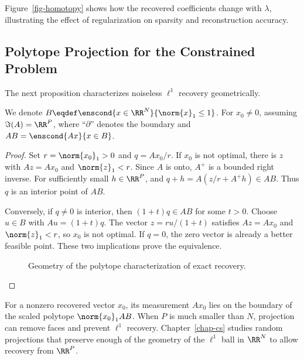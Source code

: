 Figure~\ref{fig-homotopy} shows how the recovered coefficients change with $\lambda$, illustrating the effect of regularization on sparsity and reconstruction accuracy.





                                                                                  
\subsection{Polytope Projection for the Constrained Problem}
\label{sec-polytope-proj}

The next proposition characterizes noiseless $\ell^1$ recovery geometrically.

\begin{prop}\label{prop-polytope-proj}
	We denote $B \eqdef \enscond{x \in \RR^N}{\norm{x}_1 \leq 1}$. For $x_0\neq0$, assuming $\Im(A)=\RR^P$,
	where ``$\partial$'' denotes the boundary and $AB=\enscond{Ax}{x\in B}$.
\end{prop}

\begin{proof}
Set $r=\norm{x_0}_1>0$ and $q=Ax_0/r$. If $x_0$ is not optimal, there is $z$ with $Az=Ax_0$ and $\norm{z}_1<r$. Since $A$ is onto, $A^+$ is a bounded right inverse. For sufficiently small $h\in\RR^P$,
and $q+h=A(z/r+A^+h)\in AB$. Thus $q$ is an interior point of $AB$.

Conversely, if $q\neq0$ is interior, then $(1+t)q\in AB$ for some $t>0$. Choose $u\in B$ with $Au=(1+t)q$. The vector $z=ru/(1+t)$ satisfies $Az=Ax_0$ and $\norm{z}_1<r$, so $x_0$ is not optimal. If $q=0$, the zero vector is already a better feasible point. These two implications prove the equivalence.
\begin{figure}[tbp]
\centering
{}
\caption{Geometry of the polytope characterization of exact recovery.}
\label{fig-polytope-proof}
\end{figure}
\end{proof}

For a nonzero recovered vector $x_0$, its measurement $Ax_0$ lies on the boundary of the scaled polytope $\norm{x_0}_1 A B$. When $P$ is much smaller than $N$, projection can remove faces and prevent $\ell^1$ recovery. Chapter~\ref{chap-cs} studies random projections that preserve enough of the geometry of the $\ell^1$ ball in $\RR^N$ to allow recovery from $\RR^P$.

